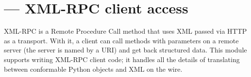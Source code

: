 \section{ --- XML-RPC client access}




XML-RPC is a Remote Procedure Call method that uses XML passed via
HTTP as a transport.  With it, a client can call methods with
parameters on a remote server (the server is named by a URI) and get back
structured data.  This module supports writing XML-RPC client code; it
handles all the details of translating between conformable Python
objects and XML on the wire.

